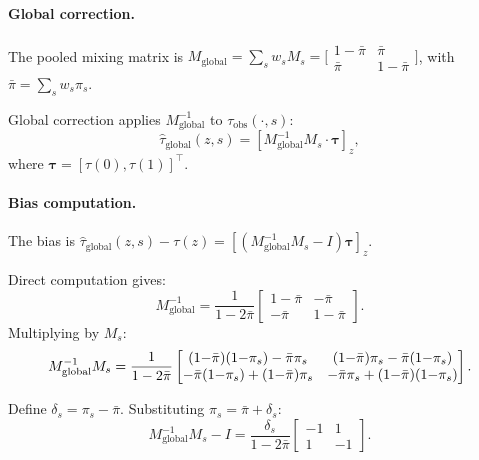 \paragraph{Global correction.}
The pooled mixing matrix is $M_{\text{global}} = \sum_s w_s M_s = \bigl[\begin{smallmatrix} 1-\bar{\pi} & \bar{\pi} \\ \bar{\pi} & 1-\bar{\pi} \end{smallmatrix}\bigr]$, with $\bar{\pi} = \sum_s w_s \pi_s$.

Global correction applies $M_{\text{global}}^{-1}$ to $\tau_{\text{obs}}(\cdot, s)$:
\begin{equation}
\hat{\tau}_{\text{global}}(z, s) = [M_{\text{global}}^{-1} M_s \cdot \boldsymbol{\tau}]_z,
\end{equation}
where $\boldsymbol{\tau} = [\tau(0), \tau(1)]^\top$.

\paragraph{Bias computation.}
The bias is $\hat{\tau}_{\text{global}}(z, s) - \tau(z) = [(M_{\text{global}}^{-1} M_s - I) \boldsymbol{\tau}]_z$.

Direct computation gives:
\begin{equation}
M_{\text{global}}^{-1} = \frac{1}{1 - 2\bar{\pi}} \begin{bmatrix} 1-\bar{\pi} & -\bar{\pi} \\ -\bar{\pi} & 1-\bar{\pi} \end{bmatrix}.
\end{equation}
Multiplying by $M_s$:
\begin{equation}
\resizebox{.88\columnwidth}{!}{$\displaystyle
M_{\text{global}}^{-1} M_s = \frac{1}{1-2\bar{\pi}} \begin{bmatrix} (1{-}\bar{\pi})(1{-}\pi_s) - \bar{\pi}\pi_s & (1{-}\bar{\pi})\pi_s - \bar{\pi}(1{-}\pi_s) \\ -\bar{\pi}(1{-}\pi_s) + (1{-}\bar{\pi})\pi_s & -\bar{\pi}\pi_s + (1{-}\bar{\pi})(1{-}\pi_s) \end{bmatrix}.
$}
\end{equation}

Define $\delta_s = \pi_s - \bar{\pi}$. Substituting $\pi_s = \bar{\pi} + \delta_s$:
\begin{equation}
M_{\text{global}}^{-1} M_s - I = \frac{\delta_s}{1-2\bar{\pi}} \begin{bmatrix} -1 & 1 \\ 1 & -1 \end{bmatrix}.
\end{equation}


